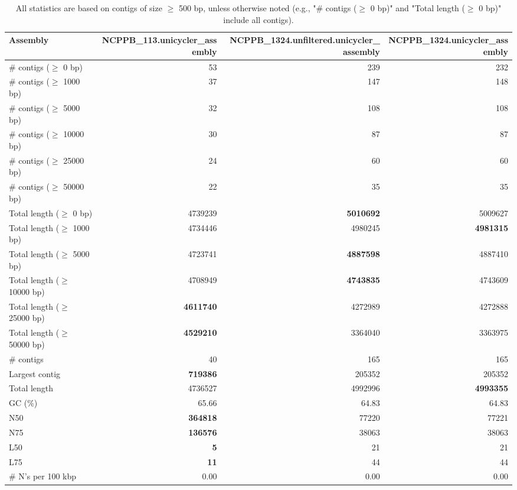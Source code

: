 \documentclass[12pt,a4paper]{article}
\begin{document}
\begin{table}[ht]
\begin{center}
\caption{All statistics are based on contigs of size $\geq$ 500 bp, unless otherwise noted (e.g., "\# contigs ($\geq$ 0 bp)" and "Total length ($\geq$ 0 bp)" include all contigs).}
\begin{tabular}{|l*{3}{|r}|}
\hline
Assembly & NCPPB\_113.unicycler\_assembly & NCPPB\_1324.unfiltered.unicycler\_assembly & NCPPB\_1324.unicycler\_assembly \\ \hline
\# contigs ($\geq$ 0 bp) & 53 & 239 & 232 \\ \hline
\# contigs ($\geq$ 1000 bp) & 37 & 147 & 148 \\ \hline
\# contigs ($\geq$ 5000 bp) & 32 & 108 & 108 \\ \hline
\# contigs ($\geq$ 10000 bp) & 30 & 87 & 87 \\ \hline
\# contigs ($\geq$ 25000 bp) & 24 & 60 & 60 \\ \hline
\# contigs ($\geq$ 50000 bp) & 22 & 35 & 35 \\ \hline
Total length ($\geq$ 0 bp) & 4739239 & {\bf 5010692} & 5009627 \\ \hline
Total length ($\geq$ 1000 bp) & 4734446 & 4980245 & {\bf 4981315} \\ \hline
Total length ($\geq$ 5000 bp) & 4723741 & {\bf 4887598} & 4887410 \\ \hline
Total length ($\geq$ 10000 bp) & 4708949 & {\bf 4743835} & 4743609 \\ \hline
Total length ($\geq$ 25000 bp) & {\bf 4611740} & 4272989 & 4272888 \\ \hline
Total length ($\geq$ 50000 bp) & {\bf 4529210} & 3364040 & 3363975 \\ \hline
\# contigs & 40 & 165 & 165 \\ \hline
Largest contig & {\bf 719386} & 205352 & 205352 \\ \hline
Total length & 4736527 & 4992996 & {\bf 4993355} \\ \hline
GC (\%) & 65.66 & 64.83 & 64.83 \\ \hline
N50 & {\bf 364818} & 77220 & 77221 \\ \hline
N75 & {\bf 136576} & 38063 & 38063 \\ \hline
L50 & {\bf 5} & 21 & 21 \\ \hline
L75 & {\bf 11} & 44 & 44 \\ \hline
\# N's per 100 kbp & 0.00 & 0.00 & 0.00 \\ \hline
\end{tabular}
\end{center}
\end{table}
\end{document}
